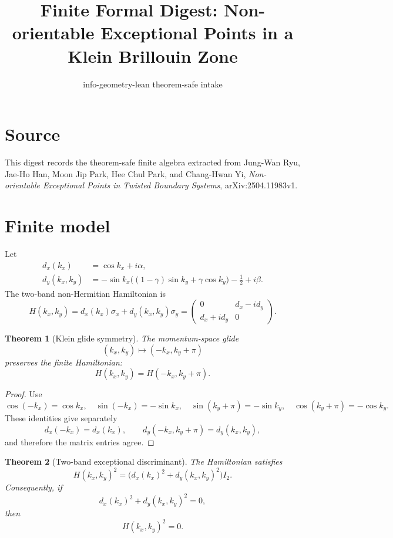 \documentclass[11pt]{article}
\title{Finite Formal Digest: Non-orientable Exceptional Points in a Klein Brillouin Zone}
\author{info-geometry-lean theorem-safe intake}
\date{}
\newtheorem{theorem}{Theorem}
\begin{document}
\maketitle

\section*{Source}
This digest records the theorem-safe finite algebra extracted from
Jung-Wan Ryu, Jae-Ho Han, Moon Jip Park, Hee Chul Park, and Chang-Hwan Yi,
\emph{Non-orientable Exceptional Points in Twisted Boundary Systems},
arXiv:2504.11983v1.

\section*{Finite model}
Let
\begin{align}
  d_x(k_x) &= \cos k_x + i\alpha,\\
  d_y(k_x,k_y) &=
    -\sin k_x\bigl((1-\gamma)\sin k_y+\gamma\cos k_y\bigr)
    -\frac12+i\beta.
\end{align}
The two-band non-Hermitian Hamiltonian is
\begin{equation}
  H(k_x,k_y)=d_x(k_x)\sigma_x+d_y(k_x,k_y)\sigma_y
  =\begin{pmatrix}
      0 & d_x-i d_y\\
      d_x+i d_y & 0
    \end{pmatrix}.
\end{equation}

\begin{theorem}[Klein glide symmetry]
The momentum-space glide
\[
  (k_x,k_y)\mapsto(-k_x,k_y+\pi)
\]
preserves the finite Hamiltonian:
\[
  H(k_x,k_y)=H(-k_x,k_y+\pi).
\]
\end{theorem}

\begin{proof}
Use
\[
\cos(-k_x)=\cos k_x,\quad \sin(-k_x)=-\sin k_x,
\quad \sin(k_y+\pi)=-\sin k_y,
\quad \cos(k_y+\pi)=-\cos k_y.
\]
These identities give separately
\[
  d_x(-k_x)=d_x(k_x),\qquad
  d_y(-k_x,k_y+\pi)=d_y(k_x,k_y),
\]
and therefore the matrix entries agree.
\end{proof}

\begin{theorem}[Two-band exceptional discriminant]
The Hamiltonian satisfies
\[
  H(k_x,k_y)^2 = \bigl(d_x(k_x)^2+d_y(k_x,k_y)^2\bigr) I_2.
\]
Consequently, if
\[
  d_x(k_x)^2+d_y(k_x,k_y)^2=0,
\]
then
\[
  H(k_x,k_y)^2=0.
\]
\end{theorem}
\end{document}
